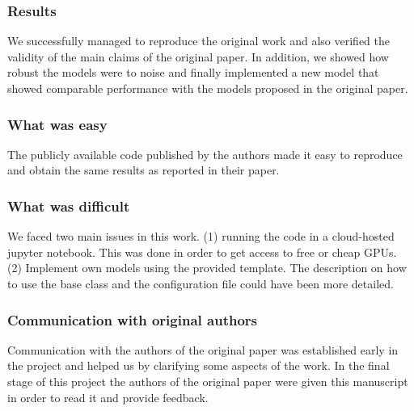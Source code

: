 \subsubsection*{Results}

We successfully managed to reproduce the original work and also verified the validity of the main claims of the original paper. In addition, we showed how robust the models were to noise and finally implemented a new model that showed comparable performance with the models proposed in the original paper. 

\subsubsection*{What was easy}
The publicly available code published by the authors made it easy to reproduce and obtain the same results as reported in their paper.



\subsubsection*{What was difficult}
We faced two main issues in this work. (1) running the code in a cloud-hosted jupyter notebook. This was done in order to get access to free or cheap GPUs. (2) Implement own models using the provided template. The description on how to use the base class and the configuration file could have been more detailed.

\subsubsection*{Communication with original authors}
Communication with the authors of the original paper was established early in the project and helped us by clarifying some aspects of the work. In the final stage of this project the authors of the original paper were given this manuscript in order to read it and provide feedback.